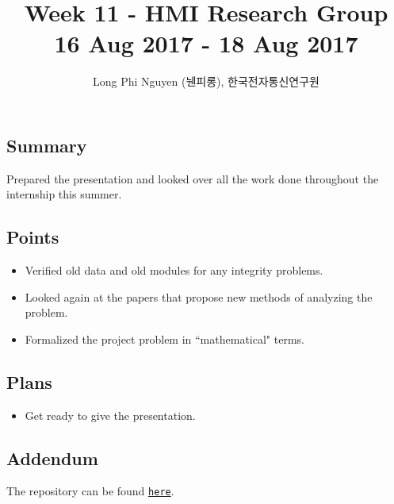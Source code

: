 \documentclass{article}
\title{Week 11 - HMI Research Group \\ \large 16 Aug 2017 - 18 Aug 2017}
\author{Long Phi Nguyen (뉀피롱), 한국전자통신연구원}
\begin{document}
  \maketitle


  \subsection*{Summary} Prepared the presentation and looked over all the work done throughout the internship this summer.

  \subsection*{Points}
  \begin{itemize}
    \item Verified old data and old modules for any integrity problems.
    \item Looked again at the papers that propose new methods of analyzing the problem.
    \item Formalized the project problem in ``mathematical" terms.
  \end{itemize} 

  \subsection*{Plans}
  \begin{itemize}
    \item Get ready to give the presentation.
  \end{itemize}

  \subsection*{Addendum}
  The repository can be found \href{https://github.com/longnguyen1997/nao_animations}{\texttt{here}}.
\end{document}
